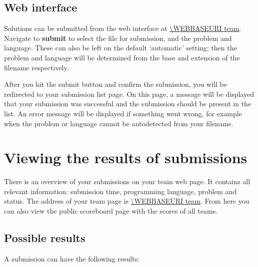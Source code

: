 \subsection{Web interface}

Solutions can be submitted from the web interface at \url{\WEBBASEURI team}.
Navigate to \textbf{submit} to select the file for submission, and the
problem and language. These can also be left on the default
`automatic' setting; then the problem and language will be determined
from the base and extension of the filename respectively.

After you hit the submit button and confirm the submission, you will
be redirected to your submission list page. On this page, a message
will be displayed that your submission was successful and the
submission should be present in the list. An error message will be
displayed if something went wrong, for example when the problem or
language cannot be autodetected from your filename.

\section{Viewing the results of submissions}

There is an overview of your submissions on your team web page.
It contains all relevant information: submission time, programming
language, problem and status. The address of your team page is
\url{\WEBBASEURI team}. From here you can also view the public
scoreboard page with the scores of all teams.

\subsection{Possible results}

A submission can have the following results:


